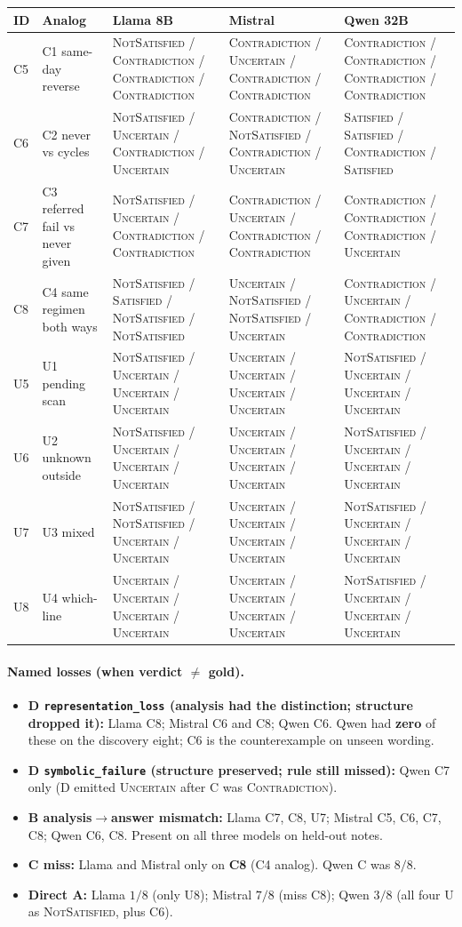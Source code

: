 \documentclass[11pt,a4paper]{article}
\newcommand{\sat}{\textsc{Satisfied}}
\newcommand{\nsat}{\textsc{NotSatisfied}}
\newcommand{\unc}{\textsc{Uncertain}}
\newcommand{\con}{\textsc{Contradiction}}
\begin{document}
{\small
\begin{center}
\begin{tabular}{ll lll}
\toprule
ID & Analog & Llama 8B & Mistral & Qwen 32B \\
\midrule
C5 & C1 same-day reverse
  & \nsat{} / \con{} / \con{} / \con{}
  & \con{} / \unc{} / \con{} / \con{}
  & \con{} / \con{} / \con{} / \con{} \\
C6 & C2 never vs cycles
  & \nsat{} / \unc{} / \con{} / \unc{}
  & \con{} / \nsat{} / \con{} / \unc{}
  & \sat{} / \sat{} / \con{} / \sat{} \\
C7 & C3 referred fail vs never given
  & \nsat{} / \unc{} / \con{} / \con{}
  & \con{} / \unc{} / \con{} / \con{}
  & \con{} / \con{} / \con{} / \unc{} \\
C8 & C4 same regimen both ways
  & \nsat{} / \sat{} / \nsat{} / \nsat{}
  & \unc{} / \nsat{} / \nsat{} / \unc{}
  & \con{} / \unc{} / \con{} / \con{} \\
U5 & U1 pending scan
  & \nsat{} / \unc{} / \unc{} / \unc{}
  & \unc{} / \unc{} / \unc{} / \unc{}
  & \nsat{} / \unc{} / \unc{} / \unc{} \\
U6 & U2 unknown outside
  & \nsat{} / \unc{} / \unc{} / \unc{}
  & \unc{} / \unc{} / \unc{} / \unc{}
  & \nsat{} / \unc{} / \unc{} / \unc{} \\
U7 & U3 mixed
  & \nsat{} / \nsat{} / \unc{} / \unc{}
  & \unc{} / \unc{} / \unc{} / \unc{}
  & \nsat{} / \unc{} / \unc{} / \unc{} \\
U8 & U4 which-line
  & \unc{} / \unc{} / \unc{} / \unc{}
  & \unc{} / \unc{} / \unc{} / \unc{}
  & \nsat{} / \unc{} / \unc{} / \unc{} \\
\bottomrule
\end{tabular}
\end{center}
}

\paragraph{Named losses (when verdict $\neq$ gold).}
\begin{itemize}
  \item \textbf{D \texttt{representation\_loss} (analysis had the distinction; structure dropped it):}
        Llama C8; Mistral C6 and C8; Qwen C6.
        Qwen had \textbf{zero} of these on the discovery eight; C6 is the counterexample on unseen wording.
  \item \textbf{D \texttt{symbolic\_failure} (structure preserved; rule still missed):}
        Qwen C7 only (D emitted \unc{} after C was \con{}).
  \item \textbf{B analysis$\rightarrow$answer mismatch:}
        Llama C7, C8, U7; Mistral C5, C6, C7, C8; Qwen C6, C8.
        Present on all three models on held-out notes.
  \item \textbf{C miss:} Llama and Mistral only on \textbf{C8} (C4 analog). Qwen C was $8/8$.
  \item \textbf{Direct A:} Llama $1/8$ (only U8); Mistral $7/8$ (miss C8); Qwen $3/8$ (all four U as \nsat{}, plus C6).
\end{itemize}
\end{document}
